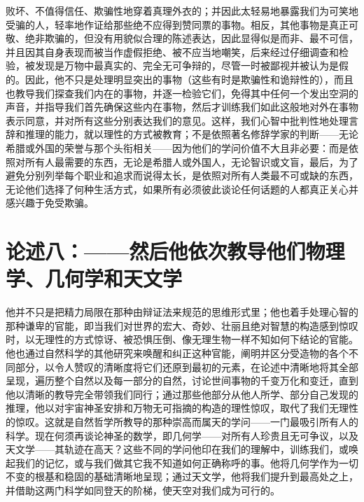 败坏、不值得信任、欺骗性地穿着真理外衣的；并因此太轻易地暴露我们为可笑地受骗的人，轻率地作证给那些绝不应得到赞同票的事物。相反，其他事物是真正可敬、绝非欺骗的，但没有用貌似合理的陈述表达，因此显得似是而非、最不可信，并且因其自身表现而被当作虚假拒绝、被不应当地嘲笑，后来经过仔细调查和检验，被发现是万物中最真实的、完全无可争辩的，尽管一时被鄙视并被认为是假的。因此，他不只是处理明显突出的事物（这些有时是欺骗性和诡辩性的），而且也教导我们探查我们内在的事物，并逐一检验它们，免得其中任何一个发出空洞的声音，并指导我们首先确保这些内在事物，然后才训练我们如此这般地对外在事物表示同意，并对所有这些分别表达我们的意见。这样，我们心智中批判性地处理言辞和推理的能力，就以理性的方式被教育；不是依照著名修辞学家的判断——无论希腊或外国的荣誉与那个头衔相关——因为他们的学问价值不大且非必要：而是依照对所有人最需要的东西，无论是希腊人或外国人，无论智识或文盲，最后，为了避免分别列举每个职业和追求而说得太长，是依照对所有人类最不可或缺的东西，无论他们选择了何种生活方式，如果所有必须彼此谈论任何话题的人都真正关心并感兴趣于免受欺骗。\par


\section{论述八：——然后他依次教导他们物理学、几何学和天文学}

他并不只是把精力局限在那种由辩证法来规范的思维形式里；他也着手处理心智的那种谦卑的官能，即当我们对世界的宏大、奇妙、壮丽且绝对智慧的构造感到惊叹时，以无理性的方式惊讶、被恐惧压倒、像无理生物一样不知如何下结论的官能。他也通过自然科学的其他研究来唤醒和纠正这种官能，阐明并区分受造物的各个不同部分，以令人赞叹的清晰度将它们还原到最初的元素，在论述中清晰地将其全部呈现，遍历整个自然以及每一部分的自然，讨论世间事物的千变万化和变迁，直到他以清晰的教导完全带领我们同行；通过那些他部分从他人所学、部分自己发现的推理，他以对宇宙神圣安排和万物无可指摘的构造的理性惊叹，取代了我们无理性的惊叹。这就是自然哲学所教导的那种崇高而属天的学问——一门最吸引所有人的科学。现在何须再谈论神圣的数学，即几何学——对所有人珍贵且无可争议，以及天文学——其轨迹在高天？这些不同的学问他印在我们的理解中，训练我们，或唤起我们的记忆，或与我们做其它我不知道如何正确称呼的事。他将几何学作为一切不变的根基和稳固的基础清晰地呈现；通过天文学，他将我们提升到最高处之上，并借助这两门科学如同登天的阶梯，使天空对我们成为可行的。\par


